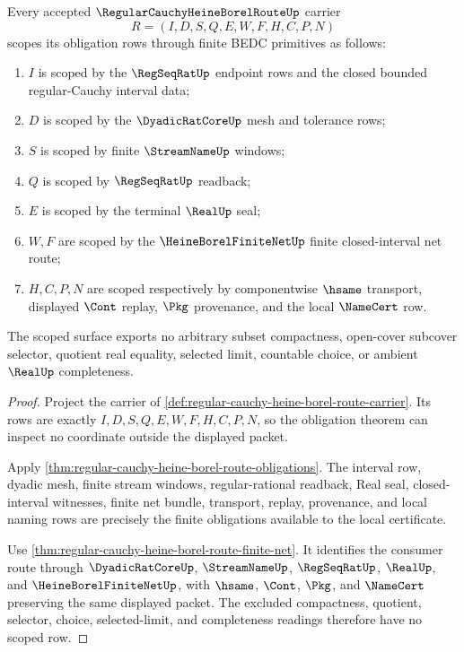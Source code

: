 \begin{theorem}
\label{thm:regular-cauchy-heine-borel-route-obligation-scope}
Every accepted $\RegularCauchyHeineBorelRouteUp$ carrier
$$
R=(I,D,S,Q,E,W,F,H,C,P,N)
$$
scopes its obligation rows through finite BEDC primitives as follows:
\begin{enumerate}
\item $I$ is scoped by the $\RegSeqRatUp$ endpoint rows and the closed bounded regular-Cauchy interval data;
\item $D$ is scoped by the $\DyadicRatCoreUp$ mesh and tolerance rows;
\item $S$ is scoped by finite $\StreamNameUp$ windows;
\item $Q$ is scoped by $\RegSeqRatUp$ readback;
\item $E$ is scoped by the terminal $\RealUp$ seal;
\item $W,F$ are scoped by the $\HeineBorelFiniteNetUp$ finite closed-interval net route;
\item $H,C,P,N$ are scoped respectively by componentwise $\hsame$ transport, displayed $\Cont$ replay, $\Pkg$ provenance, and the local $\NameCert$ row.
\end{enumerate}
The scoped surface exports no arbitrary subset compactness, open-cover subcover selector, quotient real equality, selected limit, countable choice, or ambient $\RealUp$ completeness.
\end{theorem}
\begin{proof}
Project the carrier of \autoref{def:regular-cauchy-heine-borel-route-carrier}. Its rows are exactly $I,D,S,Q,E,W,F,H,C,P,N$, so the obligation theorem can inspect no coordinate outside the displayed packet.

Apply \autoref{thm:regular-cauchy-heine-borel-route-obligations}. The interval row, dyadic mesh, finite stream windows, regular-rational readback, Real seal, closed-interval witnesses, finite net bundle, transport, replay, provenance, and local naming rows are precisely the finite obligations available to the local certificate.

Use \autoref{thm:regular-cauchy-heine-borel-route-finite-net}. It identifies the consumer route through $\DyadicRatCoreUp$, $\StreamNameUp$, $\RegSeqRatUp$, $\RealUp$, and $\HeineBorelFiniteNetUp$, with $\hsame$, $\Cont$, $\Pkg$, and $\NameCert$ preserving the same displayed packet. The excluded compactness, quotient, selector, choice, selected-limit, and completeness readings therefore have no scoped row.
\end{proof}

